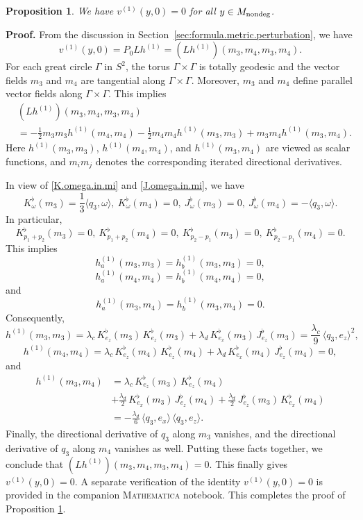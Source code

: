 \documentclass[11pt]{amsart}
\newtheorem{proposition}[theorem]{Proposition}
\theoremstyle{definition}
\begin{document}
\begin{proposition}
\label{first.order.change.in.sectional.curvature}
We have $v^{(1)}(y,0) = 0$ for all $y \in M_{\text{\rm nondeg}}$.
\end{proposition}

\textbf{Proof.} 
From the discussion in Section~\ref{sec:formula.metric.perturbation}, we have 
\[v^{(1)}(y,0)=P_0L h^{(1)}=(Lh^{(1)})(m_3,m_4,m_3,m_4).\] 
For each great circle $\Gamma$ in $S^2$, the torus $\Gamma \times \Gamma$ is totally geodesic and the vector fields $m_3$ and $m_4$ are tangential along $\Gamma \times \Gamma$. Moreover, $m_3$ and $m_4$ define parallel vector fields along $\Gamma \times \Gamma$. This implies
\begin{align*}
&(Lh^{(1)})(m_3,m_4,m_3,m_4) \\ 
&= -\frac{1}{2}m_3m_3h^{(1)}(m_4,m_4)-\frac{1}{2}m_4m_4h^{(1)}(m_3,m_3)+m_3m_4 h^{(1)}(m_3,m_4).
\end{align*}
Here $h^{(1)}(m_3,m_3)$, $h^{(1)}(m_4,m_4)$, and $h^{(1)}(m_3,m_4)$ are viewed as scalar functions, and $m_im_j$ denotes the corresponding iterated directional derivatives.

In view of \eqref{K.omega.in.mi} and \eqref{J.omega.in.mi}, we have
\[
K^\flat_\omega(m_3)=\frac{1}{3}\langle q_3,\omega \rangle,\ K^\flat_\omega(m_4)=0,\ J^\flat_\omega(m_3)=0,\ J^\flat_\omega(m_4)=-\langle q_3,\omega \rangle.
\]
In particular,
\[
K^\flat_{p_1+p_2}(m_3)=0,\ K^\flat_{p_1+p_2}(m_4)=0,\ K^\flat_{p_2-p_1}(m_3)=0,\ K^\flat_{p_2-p_1}(m_4)=0. 
\] 
This implies 
\[h^{(1)}_a(m_3,m_3) = h^{(1)}_b(m_3,m_3) = 0,\] 
\[h^{(1)}_a(m_4,m_4) = h^{(1)}_b(m_4,m_4) = 0,\] 
and 
\[h^{(1)}_a(m_3,m_4) = h^{(1)}_b(m_3,m_4) = 0.\]
Consequently, 
\[h^{(1)}(m_3,m_3) = \lambda_c \, K^\flat_{e_z}(m_3) \, K^\flat_{e_z}(m_3) + \lambda_d \, K^\flat_{e_x}(m_3) \, J^\flat_{e_z}(m_3) = \frac{\lambda_c}{9} \, \langle q_3,e_z \rangle^2,\] 
\[h^{(1)}(m_4,m_4) = \lambda_c \, K^\flat_{e_z}(m_4) \, K^\flat_{e_z}(m_4) + \lambda_d \, K^\flat_{e_x}(m_4) \, J^\flat_{e_z}(m_4) = 0,\] 
and 
\begin{align*} 
h^{(1)}(m_3,m_4) 
&= \lambda_c \, K^\flat_{e_z}(m_3) \, K^\flat_{e_z}(m_4) \\ 
&+ \frac{\lambda_d}{2} \, K^\flat_{e_x}(m_3) \, J^\flat_{e_z}(m_4) + \frac{\lambda_d}{2} \, J^\flat_{e_z}(m_3) \, K^\flat_{e_x}(m_4) \\ 
&= -\frac{\lambda_d}{6} \, \langle q_3,e_x \rangle \, \langle q_3,e_z \rangle. 
\end{align*}
Finally, the directional derivative of $q_3$ along $m_3$ vanishes, and the directional derivative of $q_3$ along $m_4$ vanishes as well. Putting these facts together, we conclude that $(Lh^{(1)})(m_3,m_4,m_3,m_4) = 0$. This finally gives $v^{(1)}(y,0)=0$. A separate verification of the identity $v^{(1)}(y,0)=0$ is provided in the companion \textsc{Mathematica} notebook. This completes the proof of Proposition \ref{first.order.change.in.sectional.curvature}. \\
\end{document}
